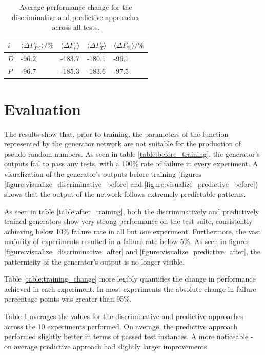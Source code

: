 \documentclass[12pt, titlepage]{report}
\theoremstyle{definition}
\begin{document}
\begin{table}[H]
    \begin{tabularx}{\textwidth}{lXXXX} \toprule
    {$i$}     & {$\langle \Delta F_{I\%} \rangle / \%$}	& {$\langle \Delta F_p \rangle$} 	& {$\langle \Delta F_T \rangle$} 	& {$\langle \Delta F_{\%} \rangle / \%$} \\ \midrule
    $D$ & -96.2 						& -183.7					& 	-180.1	  					& -96.1 \\ \midrule
    $P$ & -96.7  						& -185.3					& -183.6						& -97.5 \\ \bottomrule
\end{tabularx}
\caption[Average performance change across all experiments]{Average performance change for the discriminative and predictive approaches across all tests.}
\label{table:avg_result}
\end{table}


\section{Evaluation}\label{subsection:evaluation}
The results show that, prior to training, the parameters of the function represented by the generator network are not suitable for the production of pseudo-random numbers. As seen in table \ref{table:before_training}, the generator's outputs fail to pass any tests, with a 100\% rate of failure in every experiment. A visualization of the generator's outputs before training (figures \ref{figure:visualize_discriminative_before} and \ref{figure:visualize_predictive_before}) shows that the output of the network follows extremely predictable patterns.

As seen in table \ref{table:after_training}, both the discriminatively and predictively trained generators show very strong performance on the test suite, consistently achieving below 10\% failure rate in all but one experiment. Furthermore, the vast majority of experiments resulted in a failure rate below 5\%. As seen in figures \ref{figure:visualize_discriminative_after} and \ref{figure:visualize_predictive_after}, the patternicity of the generator's output is no longer visible.

Table \ref{table:training_change} more legibly quantifies the change in performance achieved in each experiment. In most experiments the absolute change in failure percentage points was greater than 95\%. 

Table \ref{table:avg_result} averages the values for the discriminative and predictive approaches across the 10 experiments performed. On average, the predictive approach performed slightly better in terms of passed test instances. A more noticeable 
- on average predictive approach had slightly larger improvements
\end{document}
